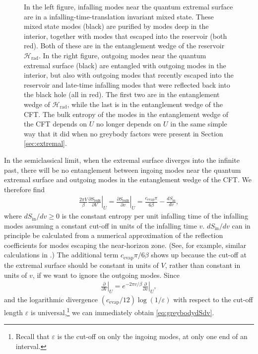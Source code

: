 \documentclass[12pt]{article}
\begin{document}
\begin{figure} [t]
\begin{subfigure}{.48\textwidth}
\end{subfigure}
\caption{In the left figure, infalling modes near the quantum extremal surface are in a infalling-time-translation invariant mixed state. These mixed state modes (black) are purified by modes deep in the interior, together with modes that escaped into the reservoir (both red). Both of these are in the entanglement wedge of the reservoir $\mathcal{H}_\text{rad}$. In the right figure, outgoing modes near the quantum extremal surface (black) are entangled with outgoing modes in the interior, but also with outgoing modes that recently escaped into the reservoir and late-time infalling modes that were reflected back into the black hole (all in red). The first two are in the entanglement wedge of $\mathcal{H}_\text{rad}$, while the last is in the entanglement wedge of the CFT. The bulk entropy of the modes in the entanglement wedge of the CFT depends on $U$ no longer depends on $U$ in the same simple way that it did when no greybody factors were present in Section \ref{sec:extremal}.}
\label{fig:reflected}
\end{figure}

In the semiclassical limit, when the extremal surface diverges into the infinite past, there will be no entanglement between ingoing modes near the quantum extremal surface and outgoing modes in the entanglement wedge of the CFT. We therefore find
\begin{align} \label{eq:greybodydSdv}
\frac{2 \pi V}{\beta}\left.\frac{\partial S_\text{bulk}}{\partial V}\right|_U = \left.\frac{\partial S_\text{bulk}}{\partial v}\right|_U = \frac{c_\text{evap} \pi}{6 \beta} - \frac{d S_\text{in}}{d v},
\end{align}
where $d S_\text{in} / d v \geq 0$ is the constant entropy per unit infalling time of the infalling modes assuming a constant cut-off in units of the infalling time $v$.  $d S_\text{in} / d v$ can in principle be calculated from a numerical approximation of the reflection coefficients for modes escaping the near-horizon zone. (See, for example, similar calculations in \cite{page1976particle}.) The additional term $c_\text{evap} \pi / 6 \beta$ shows up because the cut-off at the extremal surface should be constant in units of $V$, rather than constant in units of $v$, if we want to ignore the outgoing modes. Since
\begin{align}
\left.\frac{\partial}{\partial V}\right|_U = e^{-2 \pi v / \beta} \left.\frac{\partial}{\partial v}\right|_U,
\end{align}
and the logarithmic divergence $(c_\text{evap} / 12) \log(1/\varepsilon)$ with respect to the cut-off length $\varepsilon$ is universal,\footnote{Recall that $\varepsilon$ is the cut-off on only the ingoing modes, at only one end of an interval.} we can immediately obtain \eqref{eq:greybodydSdv}.
\end{document}
